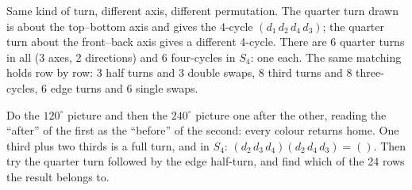 \documentclass[10pt]{article}
\begin{document}
{\begin{minipage}[t]{744pt}
\begin{minipage}[t]{360pt}
\begin{pitfall}
Same kind of turn, different axis, different permutation. The quarter turn drawn is about the top--bottom axis and gives the 4-cycle $(d_1\,d_2\,d_4\,d_3)$; the quarter turn about the front--back axis gives a different 4-cycle. There are 6 quarter turns in all (3 axes, 2 directions) and 6 four-cycles in $S_4$: one each. The same matching holds row by row: 3 half turns and 3 double swaps, 8 third turns and 8 three-cycles, 6 edge turns and 6 single swaps.
\end{pitfall}
\begin{tryit}
Do the $120^\circ$ picture and then the $240^\circ$ picture one after the other, reading the ``after'' of the first as the ``before'' of the second: every colour returns home. One third plus two thirds is a full turn, and in $S_4$: $(d_2\,d_3\,d_4)(d_2\,d_4\,d_3)=()$. Then try the quarter turn followed by the edge half-turn, and find which of the 24 rows the result belongs to.
\end{tryit}
\end{minipage}
\end{minipage}
}
\end{document}
